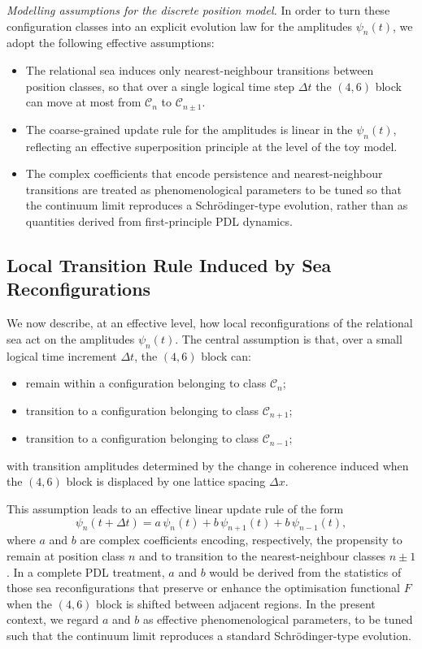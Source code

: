 \documentclass[11pt,a4paper]{article}
\begin{document}
\begin{mdframed}[linewidth=0.5pt]
\noindent\textit{Modelling assumptions for the discrete position model.} In order to turn these configuration classes into an explicit evolution law for the amplitudes $\psi_n(t)$, we adopt the following effective assumptions:
\begin{itemize}
  \item[(A1)] The relational sea induces only nearest-neighbour transitions between position classes, so that over a single logical time step $\Delta t$ the $(4,6)$ block can move at most from $\mathcal{C}_n$ to $\mathcal{C}_{n\pm 1}$.
  \item[(A2)] The coarse-grained update rule for the amplitudes is linear in the $\psi_n(t)$, reflecting an effective superposition principle at the level of the toy model.
  \item[(A3)] The complex coefficients that encode persistence and nearest-neighbour transitions are treated as phenomenological parameters to be tuned so that the continuum limit reproduces a Schr\"odinger-type evolution, rather than as quantities derived from first-principle PDL dynamics.
\end{itemize}
\end{mdframed}

\subsection{Local Transition Rule Induced by Sea Reconfigurations}

We now describe, at an effective level, how local reconfigurations of the relational sea act on the amplitudes $\psi_n(t)$. The central assumption is that, over a small logical time increment $\Delta t$, the $(4,6)$ block can:
\begin{itemize}
\item remain within a configuration belonging to class $\mathcal{C}_n$;
\item transition to a configuration belonging to class $\mathcal{C}_{n+1}$;
\item transition to a configuration belonging to class $\mathcal{C}_{n-1}$;
\end{itemize}
with transition amplitudes determined by the change in coherence induced when the $(4,6)$ block is displaced by one lattice spacing $\Delta x$.\par This assumption leads to an effective linear update rule of the form
\begin{equation}
\psi_n(t+\Delta t) = a\,\psi_n(t) + b\,\psi_{n+1}(t) + b\,\psi_{n-1}(t),
\label{eq:discreteUpdate}
\end{equation}
where $a$ and $b$ are complex coefficients encoding, respectively, the propensity to remain at position class $n$ and to transition to the nearest-neighbour classes $n\pm 1$. In a complete PDL treatment, $a$ and $b$ would be derived from the statistics of those sea reconfigurations that preserve or enhance the optimisation functional $F$ when the $(4,6)$ block is shifted between adjacent regions. In the present context, we regard $a$ and $b$ as effective phenomenological parameters, to be tuned such that the continuum limit reproduces a standard Schr\"odinger-type evolution.
\end{document}
